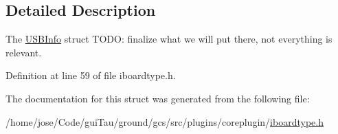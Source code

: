 \subsection{Detailed Description}
The \hyperlink{struct_core_1_1_i_board_type_1_1_u_s_b_info}{U\-S\-B\-Info} struct T\-O\-D\-O\-: finalize what we will put there, not everything is relevant. 

Definition at line 59 of file iboardtype.\-h.



The documentation for this struct was generated from the following file\-:\begin{DoxyCompactItemize}
\item 
/home/jose/\-Code/gui\-Tau/ground/gcs/src/plugins/coreplugin/\hyperlink{iboardtype_8h}{iboardtype.\-h}\end{DoxyCompactItemize}
